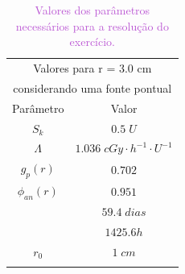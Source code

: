 \documentclass[11pt,a4paper]{article}
\begin{document}
			\begin{table}[!h]
				\centering
				\caption{\textcolor{MediumOrchid}{Valores dos parâmetros necessários para a resolução do exercício.}}
				\label{tb:paramExercCalcDose}
				\begin{tabular}{c c}
				\hline
				\multicolumn{2}{c}{Valores para r = 3.0 cm } \\
				\multicolumn{2}{c}{considerando uma fonte pontual} \\
				\midrule[1.5pt]
				Parâmetro & Valor \\
				\addlinespace[4pt]
				\midrule[1.5pt]
				$S_k$ & $0.5 \; U$ \\
				\addlinespace[4pt]
				\hline
				$\varLambda$ & $1.036 \; cGy  \cdot h^{-1} \cdot U^{-1}$ \\
				\addlinespace[4pt]
				\hline
				$g_p(r)$ & $0.702$ \\
				\addlinespace[4pt]
				\hline
				$\phi_{an}(r)$ & $0.951$ \\
				\addlinespace[4pt]
				\hline
				\multirow{2}{*}{$t_{1/2}$} & $59.4 \; dias$\\
				 & $1425.6 h$ \\
				\addlinespace[4pt]
				\hline
				 $r_0$ & $ 1 \; cm$ \\
				\addlinespace[4pt]
				\hline
				\hline
				
				\end{tabular}
			\end{table}
			
\end{document}

